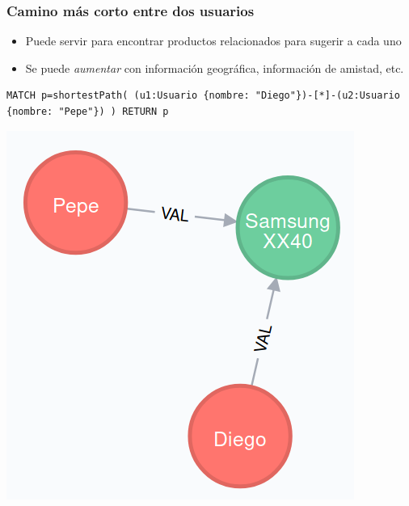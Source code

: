 \documentclass[14pt]{beamer}
\begin{document}
\begin{frame}
  \frametitle{Camino más corto entre dos usuarios}
  \begin{itemize}
  \item Puede servir para encontrar productos relacionados para sugerir a
    cada uno
  \item Se puede {\em aumentar} con información geográfica, información de
    amistad, etc.
  \end{itemize}
\begin{lstlisting}[language=cypher]
MATCH p=shortestPath( (u1:Usuario {nombre: "Diego"})-[*]-(u2:Usuario {nombre: "Pepe"}) ) RETURN p
\end{lstlisting}
  \begin{center}
    \includegraphics[height=.5\textheight]{img/neo4j3}
  \end{center}
\end{frame}

\end{document}
